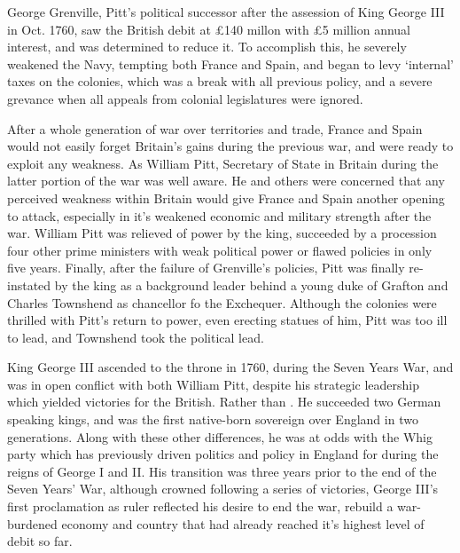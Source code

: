 George Grenville, Pitt's political successor after the assession of King George III in
Oct. 1760, saw the British debit at \pounds140 millon with \pounds5 million
annual interest, and was determined to reduce it. To accomplish this, he severely
weakened the Navy, tempting both France and Spain, and began to levy `internal'
taxes on the colonies, which was a break with all previous policy, and a severe
grevance when all appeals from colonial legislatures were
ignored.\cite[51-59]{cook_long_1995}

After a whole generation of war over territories and trade, France and Spain
would not easily forget Britain's gains during the previous war, and were ready
to exploit any weakness. As William Pitt, Secretary of State in Britain
during the latter portion of the war was well aware. He and others were
concerned that any perceived weakness within Britain would give France and
Spain another opening to attack, especially in it's weakened economic
and military strength after the war. William Pitt was relieved of power by the
king, succeeded by a procession four other prime ministers with weak political power or
flawed policies in only five years. Finally, after the failure of Grenville's
policies, Pitt was finally re-instated by the king as a background leader behind
a young duke of Grafton and Charles Townshend as chancellor fo the Exchequer.
Although the colonies were thrilled with Pitt's return to power, even erecting
statues of him, Pitt was too ill to lead, and Townshend took the political lead.

King George III ascended to the throne in 1760, during the Seven Years War, and
was in open conflict with both William Pitt, despite his strategic leadership
which yielded victories for the British. Rather than . He succeeded two German speaking
kings, and was the first native-born sovereign over England in two generations.
Along with these other differences, he was at odds with the Whig party which has
previously driven politics and policy in England for during the reigns of George
I and II. His transition was three years prior to the end of the Seven Years'
War, although crowned following a series of victories, George III's first
proclamation as ruler reflected his desire to end the war, rebuild a
war-burdened economy and country that had already reached it's highest level of
debit so far.

